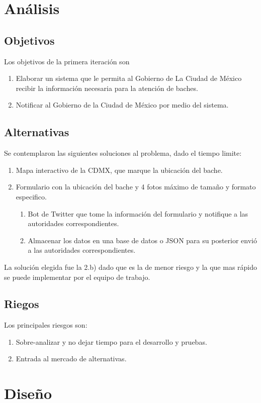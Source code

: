 \documentclass[letterpaper,11pt]{article}
\begin{document}

\section{Análisis}
\subsection{Objetivos}
Los objetivos de la primera iteración son
\begin{enumerate}
    \item Elaborar un sistema que le permita al Gobierno de La Ciudad de México recibir la información necesaria para la atención de baches.
    \item Notificar al Gobierno de la Ciudad de México por medio del sistema.
\end{enumerate}
\subsection{Alternativas}
Se contemplaron las siguientes soluciones al problema, dado el tiempo limite:
\begin{enumerate}
    \item Mapa interactivo de la CDMX, que marque la ubicación del bache.
    \item Formulario con la ubicación del bache y 4 fotos máximo de tamaño y formato especifico.
    \begin{enumerate}
        \item Bot de Twitter que tome la información del formulario y notifique a las autoridades correspondientes.
        \item Almacenar los datos en una base de datos o JSON para su posterior envió a las autoridades correspondientes.
    \end{enumerate}
\end{enumerate}
La solución elegida fue la 2.b) dado que es la de menor riesgo y la que mas rápido se puede implementar por el equipo de trabajo.
\subsection{Riegos}
Los principales riesgos son:
\begin{enumerate}
    \item Sobre-analizar y no dejar tiempo para el desarrollo y pruebas.
    \item Entrada al mercado de alternativas.
\end{enumerate}
\section{Diseño}
\end{document}
